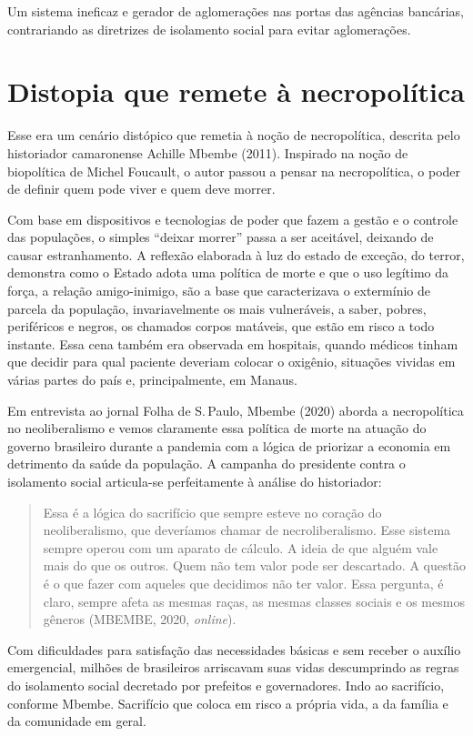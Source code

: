 Um sistema ineficaz e gerador de aglomerações nas portas das agências
bancárias, contrariando as diretrizes de isolamento social para evitar
aglomerações.

\section{Distopia que remete à necropolítica}

Esse era um cenário distópico que remetia à noção de necropolítica,
descrita pelo historiador camaronense Achille Mbembe (2011). Inspirado na
noção de biopolítica de Michel Foucault, o autor passou a pensar na
necropolítica, o poder de definir quem pode viver e quem deve morrer.

Com base em dispositivos e tecnologias de poder que fazem a gestão e o
controle das populações, o simples ``deixar morrer'' passa a ser
aceitável, deixando de causar estranhamento. A reflexão elaborada à luz
do estado de exceção, do terror, demonstra como o Estado adota uma
política de morte e que o uso legítimo da força, a relação
amigo-inimigo, são a base que caracterizava o extermínio de parcela da
população, invariavelmente os mais vulneráveis, a saber, pobres,
periféricos e negros, os chamados corpos matáveis, que estão em risco a
todo instante. Essa cena também era observada em hospitais, quando
médicos tinham que decidir para qual paciente deveriam colocar o
oxigênio, situações vividas em várias partes do país e, principalmente,
em Manaus.

Em entrevista ao jornal Folha de S.\,Paulo, Mbembe (2020) aborda a
necropolítica no neoliberalismo e vemos claramente essa política de
morte na atuação do governo brasileiro durante a pandemia com a lógica
de priorizar a economia em detrimento da saúde da população. A campanha
do presidente contra o isolamento social articula-se perfeitamente à
análise do historiador:

\begin{quote}
Essa é a lógica do sacrifício que sempre esteve no coração do
neoliberalismo, que deveríamos chamar de necroliberalismo. Esse sistema
sempre operou com um aparato de cálculo. A ideia de que alguém vale mais
do que os outros. Quem não tem valor pode ser descartado. A questão é o
que fazer com aqueles que decidimos não ter valor. Essa pergunta, é
claro, sempre afeta as mesmas raças, as mesmas classes sociais e os
mesmos gêneros (MBEMBE, 2020, \textit{online}).
\end{quote}

Com dificuldades para satisfação das necessidades básicas e sem receber
o auxílio emergencial, milhões de brasileiros arriscavam suas vidas
descumprindo as regras do isolamento social decretado por prefeitos e
governadores. Indo ao sacrifício, conforme Mbembe. Sacrifício que coloca
em risco a própria vida, a da família e da comunidade em geral.

